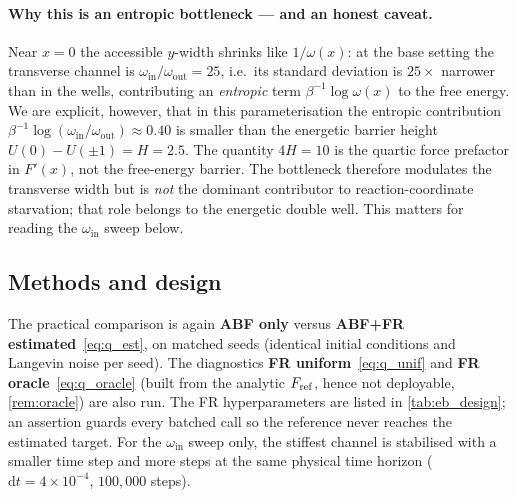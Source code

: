 \paragraph{Why this is an entropic bottleneck --- and an honest caveat.}
Near $x=0$ the accessible $y$-width shrinks like $1/\omega(x)$: at the base
setting the transverse channel is $\omega_{\mathrm{in}}/\omega_{\mathrm{out}}=25$,
i.e.\ its standard deviation is $25\times$ narrower than in the wells,
contributing an \emph{entropic}
term $\beta^{-1}\log\omega(x)$ to the free energy. We are explicit, however, that
in this parameterisation the entropic contribution
$\beta^{-1}\log(\omega_{\mathrm{in}}/\omega_{\mathrm{out}})\approx0.40$ is smaller
than the energetic barrier height $U(0)-U(\pm1)=H=2.5$. The quantity $4H=10$ is the
quartic force prefactor in $F'(x)$, not the free-energy barrier. The bottleneck
therefore modulates the transverse width but is \emph{not} the dominant
contributor to reaction-coordinate starvation; that role belongs to the energetic
double well. This matters for reading the $\omega_{\mathrm{in}}$ sweep below.

\subsection{Methods and design}
The practical comparison is again \textbf{ABF only} versus \textbf{ABF+FR
estimated}~\eqref{eq:q_est}, on matched seeds (identical initial conditions and
Langevin noise per seed). The diagnostics \textbf{FR uniform}~\eqref{eq:q_unif}
and \textbf{FR oracle}~\eqref{eq:q_oracle} (built from the analytic $F_{\mathrm{ref}}$, hence
not deployable, \cref{rem:oracle}) are also run. The FR hyperparameters are listed
in \cref{tab:eb_design}; an assertion guards every batched call so the reference
never reaches the estimated target. For the $\omega_{\mathrm{in}}$ sweep only, the
stiffest channel is stabilised with a smaller time step and more steps at the same
physical time horizon ($\mathrm{d}t=4\times10^{-4}$, $100{,}000$ steps).



